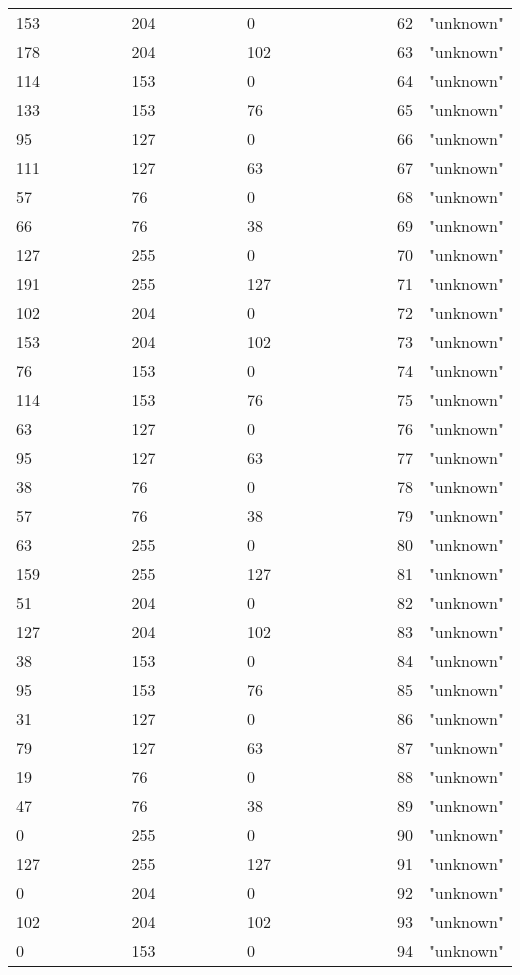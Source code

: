 \begin{longtable}{p{0.3\linewidth} p{0.3\linewidth} p{0.4\linewidth}}
153 &  204 &    0 &   62 &  "unknown"\\
178 &  204 &  102 &   63 &  "unknown"\\
114 &  153 &    0 &   64 &  "unknown"\\
133 &  153 &   76 &   65 &  "unknown"\\
 95 &  127 &    0 &   66 &  "unknown"\\
111 &  127 &   63 &   67 &  "unknown"\\
 57 &   76 &    0 &   68 &  "unknown"\\
 66 &   76 &   38 &   69 &  "unknown"\\
127 &  255 &    0 &   70 &  "unknown"\\
191 &  255 &  127 &   71 &  "unknown"\\
102 &  204 &    0 &   72 &  "unknown"\\
153 &  204 &  102 &   73 &  "unknown"\\
 76 &  153 &    0 &   74 &  "unknown"\\
114 &  153 &   76 &   75 &  "unknown"\\
 63 &  127 &    0 &   76 &  "unknown"\\
 95 &  127 &   63 &   77 &  "unknown"\\
 38 &   76 &    0 &   78 &  "unknown"\\
 57 &   76 &   38 &   79 &  "unknown"\\
 63 &  255 &    0 &   80 &  "unknown"\\
159 &  255 &  127 &   81 &  "unknown"\\
 51 &  204 &    0 &   82 &  "unknown"\\
127 &  204 &  102 &   83 &  "unknown"\\
 38 &  153 &    0 &   84 &  "unknown"\\
 95 &  153 &   76 &   85 &  "unknown"\\
 31 &  127 &    0 &   86 &  "unknown"\\
 79 &  127 &   63 &   87 &  "unknown"\\
 19 &   76 &    0 &   88 &  "unknown"\\
 47 &   76 &   38 &   89 &  "unknown"\\
  0 &  255 &    0 &   90 &  "unknown"\\
127 &  255 &  127 &   91 &  "unknown"\\
  0 &  204 &    0 &   92 &  "unknown"\\
102 &  204 &  102 &   93 &  "unknown"\\
  0 &  153 &    0 &   94 &  "unknown"\\

\end{longtable}
